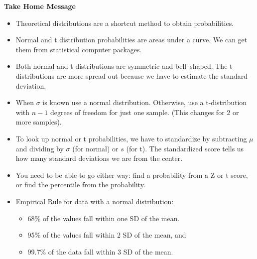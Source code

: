 \begin{center}
  {\large\bf Take Home Message}
\end{center}
 
\begin{itemize}
\item Theoretical distributions are a shortcut method to obtain
  probabilities.
\item Normal and t distribution probabilities are areas under a
  curve. We can get them from statistical computer packages.
\item Both normal and t distributions are symmetric and
  bell--shaped. The t-distributions are more spread out because we
  have to estimate the standard deviation.
\item When $\sigma$ is known use a normal distribution. Otherwise, use
  a t-distribution with $n-1$ degrees of freedom for just one
  sample. (This changes for 2 or more samples).
\item To look up normal or t probabilities, we have to standardize by
  subtracting $\mu$ and dividing by $\sigma$ (for normal) or $s$ (for
  t). The standardized score tells us how many standard deviations we
  are from the center.
\item You need to be able to go either way: find a probability from a
  Z or t score, or find the percentile from the probability.
\item Empirical Rule for data with a normal distribution:\\
  \begin{itemize}
  \item 68\% of the values fall within one SD of the mean.
  \item 95\% of the values fall within 2 SD of the mean, and 
  \item 99.7\% of the data fall within 3 SD of the mean.
  \end{itemize}
\end{itemize}





